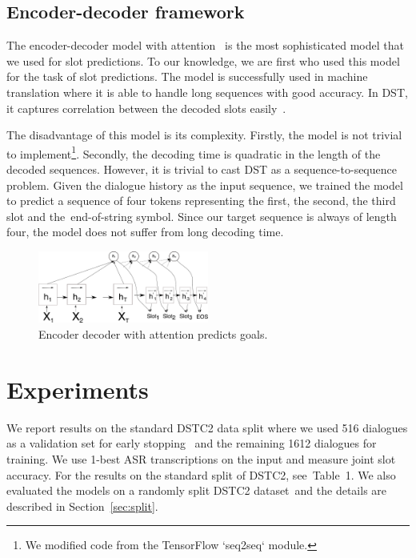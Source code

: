 \documentclass{itatnew}
\def\PB#1{\textcolor{red}{PB: \textit{#1}}}
\def\OD#1{{\color{darkgreen}OD: \it #1}}
\begin{document}
\subsection{Encoder-decoder framework}
\label{sec:encdec}
The encoder-decoder model with attention~\cite{bahdanau2014neural} is the most sophisticated model that we used for slot predictions.
To our knowledge, we are first who used this model for the task of slot predictions.
The model is successfully used in machine translation where it is able to handle long sequences with good accuracy.
In DST, it captures correlation between the decoded slots easily~\cite{bahdanau2014neural}. 

The disadvantage of this model is its complexity.
Firstly, the model is not trivial to implement\footnote{We modified code from the TensorFlow `seq2seq` module.}. Secondly, the decoding time is quadratic in the length of the decoded sequences.
However, it is trivial to cast DST as a sequence-to-sequence problem. Given the dialogue history as the input sequence, we trained the model to predict a sequence of four tokens representing the first, the second, the third slot and the~end-of-string symbol.
Since our target sequence is always of length four, the model does not suffer from long decoding time. 
\begin{figure}
\includegraphics[width=0.5\textwidth]{encdec}
\caption{Encoder decoder with attention predicts goals.}
\label{fig:encdec}
\end{figure}

\section{Experiments}
\label{sec:exp}
We report results on the standard DSTC2 data split where we used 516 dialogues as a validation set for early stopping~\cite{prechelt1998early} and the remaining 1612 dialogues for training.
We use 1-best ASR transcriptions on the input and measure joint slot accuracy.
For the results on the standard split of DSTC2, see~Table~1.
We also evaluated the models on a randomly split DSTC2 dataset\, and the details are described in Section~\ref{sec:split}.
\end{document}
